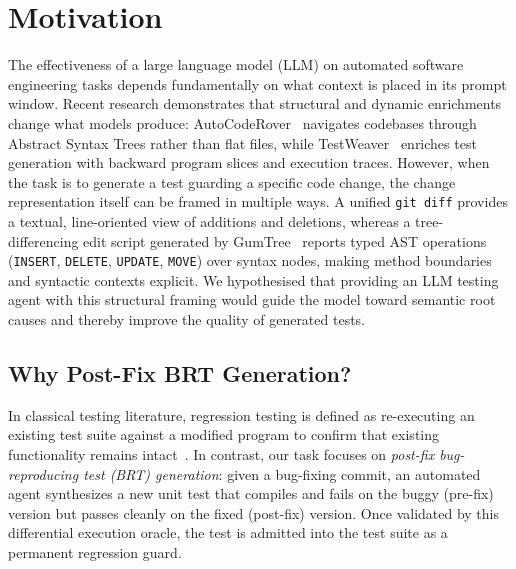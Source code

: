 \documentclass[12pt, a4paper]{article}
\begin{document}
\tableofcontents
\newpage

\section{Motivation}\label{sec:motivation}

The effectiveness of a large language model (LLM) on automated software engineering tasks depends fundamentally on what context is placed in its prompt window.
Recent research demonstrates that structural and dynamic enrichments change what models produce: AutoCodeRover~\citep{zhang2024autocoderover} navigates codebases through Abstract Syntax Trees rather than flat files, while TestWeaver~\citep{le2025testweaver} enriches test generation with backward program slices and execution traces.
However, when the task is to generate a test guarding a specific code change, the change representation itself can be framed in multiple ways.
A unified \texttt{git diff} provides a textual, line-oriented view of additions and deletions, whereas a tree-differencing edit script generated by GumTree~\citep{falleri2014fine} reports typed AST operations (\texttt{INSERT}, \texttt{DELETE}, \texttt{UPDATE}, \texttt{MOVE}) over syntax nodes, making method boundaries and syntactic contexts explicit.
We hypothesised that providing an LLM testing agent with this structural framing would guide the model toward semantic root causes and thereby improve the quality of generated tests.

\subsection{Why Post-Fix BRT Generation?}\label{sec:use_cases}

In classical testing literature, regression testing is defined as re-executing an existing test suite against a modified program to confirm that existing functionality remains intact~\citep{yoo2012regression}.
In contrast, our task focuses on \emph{post-fix bug-reproducing test (BRT) generation}: given a bug-fixing commit, an automated agent synthesizes a new unit test that compiles and fails on the buggy (pre-fix) version but passes cleanly on the fixed (post-fix) version.
Once validated by this differential execution oracle, the test is admitted into the test suite as a permanent regression guard.
\end{document}
